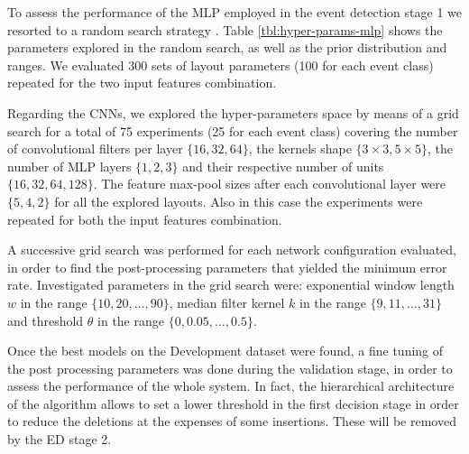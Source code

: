%
To assess the performance of the MLP employed in the event detection stage 1 we resorted to a random search strategy \cite{bergstra2012random}.
Table \ref{tbl:hyper-params-mlp} shows the parameters explored in the random search, as well as the prior distribution and ranges. We evaluated 300 sets of layout parameters (100 for each event class) repeated for the two input features combination.

Regarding the CNNs, we explored the hyper-parameters space by means of a grid search for a total of 75 experiments (25 for each event class) covering the number of convolutional filters per layer $\{16,32,64\}$, the kernels shape $\{3 \times 3, 5 \times 5\}$, the number of MLP layers $\{1,2,3\}$ and their respective number of units $\{16,32,64,128\}$. The feature
max-pool sizes after each convolutional layer were $\{5,4,2\}$ for all the explored layouts. Also in this case the experiments were repeated for both the input features combination.

A successive grid search was performed for each network configuration evaluated, in order to find the post-processing parameters that yielded the minimum error rate. Investigated parameters in the grid search were: exponential window length $w$ in the range $\{10,20,\dots,90\}$, median filter kernel $k$ in the range $\{9,11,\dots,31\}$ and threshold $\theta$ in the range $\{0,0.05,\dots,0.5\}$. 

Once the best models on the Development dataset were found, a fine tuning of the post processing parameters was done during the validation stage, in order to assess the performance of the whole system. In fact, the hierarchical architecture of the algorithm allows to set a lower threshold in the first decision stage in order to reduce the deletions at the expenses of some insertions. These will be removed by the ED stage 2. 




